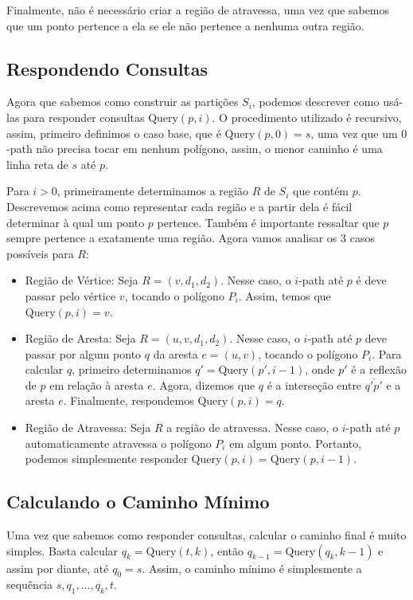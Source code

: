 \documentclass{article}
\begin{document}
Finalmente, não é necessário criar a região de atravessa, uma vez que sabemos que um ponto pertence a ela se ele não pertence a nenhuma outra região.

\subsection{Respondendo Consultas}

Agora que sabemos como construir as partições \(S_i\), podemos descrever como usá-las para responder consultas \(\text{Query}(p, i)\). O procedimento utilizado é recursivo, assim, primeiro definimos o caso base, que é \(\text{Query}(p, 0) = s\), uma vez que um \(0\)-path não precisa tocar em nenhum polígono, assim, o menor caminho é uma linha reta de \(s\) até \(p\).

Para \(i > 0\), primeiramente determinamos a região \(R\) de \(S_i\) que contém \(p\). Descrevemos acima como representar cada região e a partir dela é fácil determinar à qual um ponto \(p\) pertence. Também é importante ressaltar que \(p\) sempre pertence a exatamente uma região. Agora vamos analisar os 3 casos possíveis para \(R\):

\begin{itemize}

	\item Região de Vértice: Seja \(R = (v, d_1, d_2)\). Nesse caso, o \(i\)-path até \(p\) é deve passar pelo vértice \(v\), tocando o polígono \(P_i\). Assim, temos que \(\text{Query}(p, i) = v\).
	
	\item Região de Aresta: Seja \(R = (u, v, d_1, d_2)\). Nesse caso, o \(i\)-path até \(p\) deve passar por algum ponto \(q\) da aresta \(e = (u, v)\), tocando o polígono \(P_i\). Para calcular \(q\), primeiro determinamos \(q' = \text{Query}(p', i - 1)\), onde \(p'\) é a reflexão de \(p\) em relação à aresta \(e\). 
	Agora, dizemos que \(q\) é a interseção entre \(\overline{q'p'}\) e a aresta \(e\). Finalmente, respondemos \(\text{Query}(p, i) = q\).

	\item Região de Atravessa: Seja \(R\) a região de atravessa. Nesse caso, o \(i\)-path até \(p\) automaticamente atravessa o polígono \(P_i\) em algum ponto. Portanto, podemos simplesmente responder \(\text{Query}(p, i) = \text{Query}(p, i - 1)\).

\end{itemize}

\subsection{Calculando o Caminho Mínimo}

Uma vez que sabemos como responder consultas, calcular o caminho final é muito simples. Basta calcular \(q_k = \text{Query}(t, k)\), então \(q_{k - 1} =\text{Query}(q_k, k - 1)\) e assim por diante, até \(q_0 = s\). Assim, o caminho mínimo é simplesmente a sequência \(s, q_1, \ldots, q_k, t\).


\end{document}
